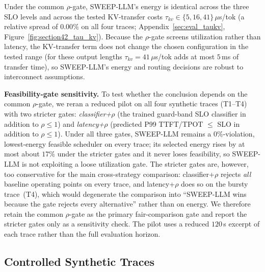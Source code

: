 Under the common $\rho$-gate, SWEEP-LLM's energy is identical across the three SLO levels and
across the tested KV-transfer costs $\tau_{kv}\in\{5,16,41\}\,\mu$s/tok
(a relative spread of $0.00\%$ on all four traces; Appendix~\ref{sec:eval_taukv}, Figure~\ref{fig:section42_tau_kv}).
Because the $\rho$-gate screens utilization rather than latency, the
KV-transfer term does not change the chosen configuration in the tested range (for these
output lengths $\tau_{kv}{=}41\,\mu$s/tok adds at most $5$\,ms of transfer time), so
SWEEP-LLM's energy and routing decisions are robust to interconnect assumptions.

\textbf{Feasibility-gate sensitivity.}
\label{sec:gate_sensitivity}
To test whether the conclusion depends on the common $\rho$-gate, we reran a reduced pilot on all four synthetic traces (T1--T4) with two stricter gates: \emph{classifier+$\rho$} (the trained guard-band SLO classifier in addition to $\rho{\le}1$) and \emph{latency+$\rho$} (predicted P99 TTFT/TPOT $\le$ SLO in addition to $\rho{\le}1$).
Under all three gates, SWEEP-LLM remains a $0\%$-violation, lowest-energy feasible scheduler on every trace; its selected energy rises by at most about $17\%$ under the stricter gates and it never loses feasibility, so SWEEP-LLM is not exploiting a loose utilization gate.
The stricter gates are, however, too conservative for the main cross-strategy comparison: classifier+$\rho$ rejects \emph{all} baseline operating points on every trace, and latency+$\rho$ does so on the bursty trace~(T4), which would degenerate the comparison into ``SWEEP-LLM wins because the gate rejects every alternative'' rather than on energy.
We therefore retain the common $\rho$-gate as the primary fair-comparison gate and report the stricter gates only as a sensitivity check.
The pilot uses a reduced $120$\,s excerpt of each trace rather than the full evaluation horizon.
\fi

\subsection{Controlled Synthetic Traces}
\label{sec:eval_synth}

